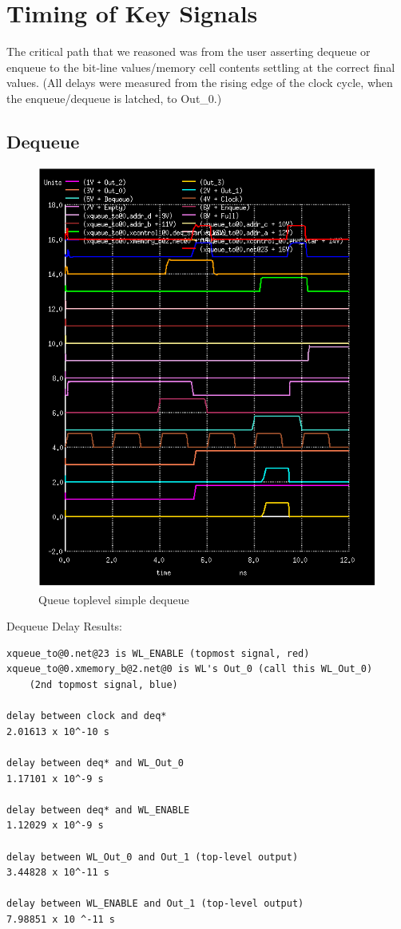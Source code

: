 \documentclass[12pt]{report}
\begin{document}
\newpage
\section*{Timing of Key Signals}
The critical path that we reasoned was from the user asserting dequeue or enqueue to the bit-line values/memory cell contents settling at the correct final values. (All delays were measured from the rising edge of the clock cycle, when the enqueue/dequeue is latched, to Out\_0.)
\subsection*{Dequeue}
\begin{figure}[H]
  \centering
    \includegraphics[width=1.0\textwidth]{queue_toplevel_test_simple_deq.PNG}
  \caption{Queue toplevel simple dequeue}
\end{figure}

Dequeue Delay Results:
\begin{verbatim}
xqueue_to@0.net@23 is WL_ENABLE (topmost signal, red)
xqueue_to@0.xmemory_b@2.net@0 is WL's Out_0 (call this WL_Out_0) 
    (2nd topmost signal, blue)

delay between clock and deq*
2.01613 x 10^-10 s

delay between deq* and WL_Out_0
1.17101 x 10^-9 s

delay between deq* and WL_ENABLE
1.12029 x 10^-9 s

delay between WL_Out_0 and Out_1 (top-level output)
3.44828 x 10^-11 s

delay between WL_ENABLE and Out_1 (top-level output)
7.98851 x 10 ^-11 s
\end{verbatim}
\end{document}
